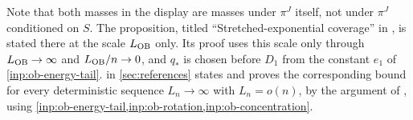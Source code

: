 Note that both masses in the display are masses under $\pi^J$ itself, not under
$\pi^J$ conditioned on $S$. The proposition, titled ``Stretched-exponential coverage'' in
\cite{oai-barriers}, is stated there at the scale $L_{\rm OB}$ only. Its proof uses this scale only through $L_{\rm
OB}\to\infty$ and $L_{\rm OB}/n\to0$, and $q_*$ is chosen before $D_1$ from the
constant $e_1$ of \cref{inp:ob-energy-tail}.  in
\cref{sec:references} states and proves the corresponding bound for every
deterministic sequence $L_n\to\infty$ with $L_n=o(n)$, by the argument of
\cite[Section~6]{oai-barriers}, using
\cref{inp:ob-energy-tail,inp:ob-rotation,inp:ob-concentration}.
